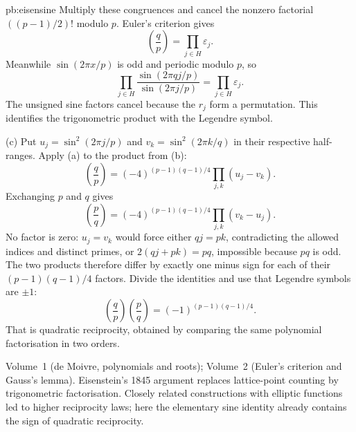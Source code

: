 \begin{solution}{pb:eisensine}
Multiply these congruences and cancel the nonzero factorial $((p-1)/2)!$ modulo $p$. Euler's criterion gives
\[
\left(\frac qp\right)=\prod_{j\in H}\varepsilon_j.
\]
Meanwhile $\sin(2\pi x/p)$ is odd and periodic modulo $p$, so
\[
\prod_{j\in H}
\frac{\sin(2\pi qj/p)}{\sin(2\pi j/p)}
=\prod_{j\in H}\varepsilon_j.
\]
The unsigned sine factors cancel because the $r_j$ form a permutation. This identifies the trigonometric product with the Legendre symbol.

(c) Put
$u_j=\sin^2(2\pi j/p)$ and $v_k=\sin^2(2\pi k/q)$ in their respective half-ranges. Apply (a) to the product from (b):
\[
\left(\frac qp\right)
=(-4)^{(p-1)(q-1)/4}\prod_{j,k}(u_j-v_k).
\]
Exchanging $p$ and $q$ gives
\[
\left(\frac pq\right)
=(-4)^{(p-1)(q-1)/4}\prod_{j,k}(v_k-u_j).
\]
No factor is zero: $u_j=v_k$ would force either $qj=pk$, contradicting the allowed indices and distinct primes, or $2(qj+pk)=pq$, impossible because $pq$ is odd. The two products therefore differ by exactly one minus sign for each of their $(p-1)(q-1)/4$ factors. Divide the identities and use that Legendre symbols are $\pm1$:
\[
\left(\frac qp\right)\left(\frac pq\right)
=(-1)^{(p-1)(q-1)/4}.
\]
That is quadratic reciprocity, obtained by comparing the same polynomial factorisation in two orders.

\tools Volume~1 (de Moivre, polynomials and roots); Volume~2 (Euler's criterion and Gauss's lemma).
\leads Eisenstein's 1845 argument replaces lattice-point counting by trigonometric factorisation. Closely related constructions with elliptic functions led to higher reciprocity laws; here the elementary sine identity already contains the sign of quadratic reciprocity.
\end{solution}

